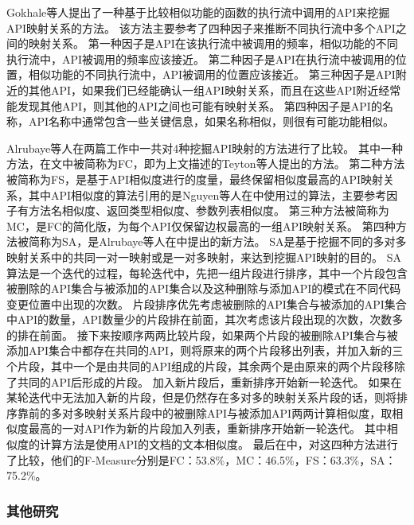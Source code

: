 \documentclass[UTF8]{ctexart}
\begin{document}
Gokhale等人\cite{2013ICSE-Gokhale-Inferring}提出了一种基于比较相似功能的函数的执行流中调用的API来挖掘API映射关系的方法。
该方法主要参考了四种因子来推断不同执行流中多个API之间的映射关系。
第一种因子是API在该执行流中被调用的频率，相似功能的不同执行流中，API被调用的频率应该接近。
第二种因子是API在执行流中被调用的位置，相似功能的不同执行流中，API被调用的位置应该接近。
第三种因子是API附近的其他API，如果我们已经能确认一组API映射关系，而且在这些API附近经常能发现其他API，则其他的API之间也可能有映射关系。
第四种因子是API的名称，API名称中通常包含一些关键信息，如果名称相似，则很有可能功能相似。

Alrubaye等人在两篇工作中\cite{2018CASCON-Alrubaye-Automating}\cite{2019ICPC-Alrubaye-On}一共对4种挖掘API映射的方法进行了比较。
其中一种方法，在文中被简称为FC，即为上文描述的Teyton等人\cite{2013WCRE-Teyton-Automatic}提出的方法。
第二种方法被简称为FS，是基于API相似度进行的度量，最终保留相似度最高的API映射关系，其中API相似度的算法引用的是Nguyen等人在\cite{2010OOPSLA-Nguyen-Graph}中使用过的算法，主要参考因子有方法名相似度、返回类型相似度、参数列表相似度。
第三种方法被简称为MC，是FC的简化版，为每个API仅保留边权最高的一组API映射关系。
第四种方法被简称为SA，是Alrubaye等人在\cite{2019ICPC-Alrubaye-On}中提出的新方法。
SA是基于挖掘不同的多对多映射关系中的共同一对一映射或是一对多映射，来达到挖掘API映射的目的。
SA算法是一个迭代的过程，每轮迭代中，先把一组片段进行排序，其中一个片段包含被删除的API集合与被添加的API集合以及这种删除与添加API的模式在不同代码变更位置中出现的次数。
片段排序优先考虑被删除的API集合与被添加的API集合中API的数量，API数量少的片段排在前面，其次考虑该片段出现的次数，次数多的排在前面。
接下来按顺序两两比较片段，如果两个片段的被删除API集合与被添加API集合中都存在共同的API，则将原来的两个片段移出列表，并加入新的三个片段，其中一个是由共同的API组成的片段，其余两个是由原来的两个片段移除了共同的API后形成的片段。
加入新片段后，重新排序开始新一轮迭代。
如果在某轮迭代中无法加入新的片段，但是仍然存在多对多的映射关系片段的话，则将排序靠前的多对多映射关系片段中的被删除API与被添加API两两计算相似度，取相似度最高的一对API作为新的片段加入列表，重新排序开始新一轮迭代。
其中相似度的计算方法是使用API的文档的文本相似度。
最后在\cite{2019ICPC-Alrubaye-On}中，对这四种方法进行了比较，他们的F-Measure分别是FC：53.8\%，MC：46.5\%，FS：63.3\%，SA：75.2\%。


\subsubsection{其他研究}
\end{document}

